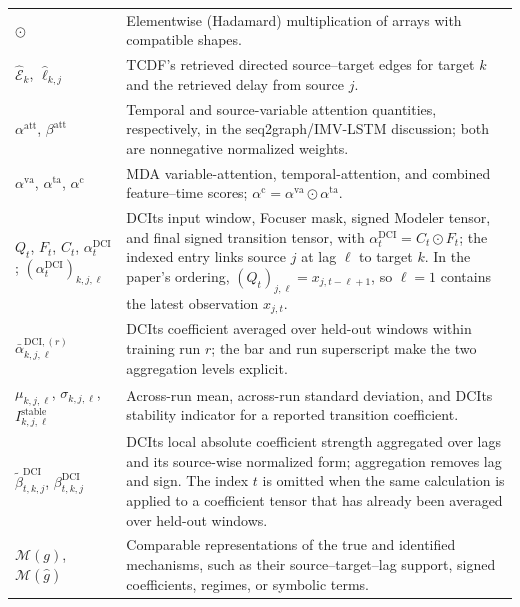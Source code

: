 \begin{longtable}{@{}
>{\raggedright\arraybackslash}p{}
>{\raggedright\arraybackslash}p{}@{}}
$\odot$ &
Elementwise (Hadamard) multiplication of arrays with compatible shapes. \\

$\widehat{\mathcal E}_k$, $\widehat\ell_{k,j}$ &
TCDF's retrieved directed source--target edges for target $k$ and the retrieved
delay from source $j$. \\

$\alpha^{\mathrm{att}}$, $\beta^{\mathrm{att}}$ &
Temporal and source-variable attention quantities, respectively, in the
seq2graph/IMV-LSTM discussion; both are nonnegative normalized weights. \\

$\alpha^{\mathrm{va}}$, $\alpha^{\mathrm{ta}}$,
$\alpha^{\mathrm{c}}$ &
MDA variable-attention, temporal-attention, and combined feature--time scores;
$\alpha^{\mathrm{c}}=\alpha^{\mathrm{va}}\odot\alpha^{\mathrm{ta}}$. \\

$Q_t$, $F_t$, $C_t$, $\alpha^{\mathrm{DCI}}_t$;
$(\alpha^{\mathrm{DCI}}_t)_{k,j,\ell}$ &
DCIts input window, Focuser mask, signed Modeler tensor, and final signed
transition tensor, with $\alpha^{\mathrm{DCI}}_t=C_t\odot F_t$; the indexed
entry links source $j$ at lag $\ell$ to target $k$. In the paper's ordering,
$(Q_t)_{j,\ell}=x_{j,t-\ell+1}$, so $\ell=1$ contains the latest observation
$x_{j,t}$. \\

$\bar\alpha^{\mathrm{DCI},(r)}_{k,j,\ell}$ &
DCIts coefficient averaged over held-out windows within training run $r$; the
bar and run superscript make the two aggregation levels explicit. \\

$\mu_{k,j,\ell}$, $\sigma_{k,j,\ell}$,
$I^{\mathrm{stable}}_{k,j,\ell}$ &
Across-run mean, across-run standard deviation, and DCIts stability indicator
for a reported transition coefficient. \\

$\widetilde\beta^{\mathrm{DCI}}_{t,k,j}$,
$\beta^{\mathrm{DCI}}_{t,k,j}$ &
DCIts local absolute coefficient strength aggregated over lags and its
source-wise normalized form; aggregation removes lag and sign. The index $t$
is omitted when the same calculation is applied to a coefficient tensor that
has already been averaged over held-out windows. \\

$\mathcal M(g)$, $\mathcal M(\widehat g)$ &
Comparable representations of the true and identified mechanisms, such as
their source--target--lag support, signed coefficients, regimes, or symbolic
terms. \\


\end{longtable}
